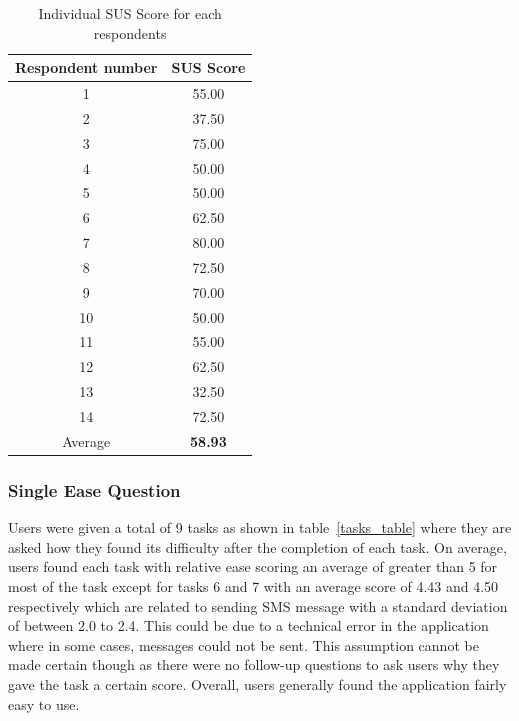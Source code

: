\documentclass{report}
\begin{document}
\begin{table}[h]
	\begin{tabular}{| c | c |}
		\hline
		\multicolumn{1}{|l|}{Respondent number} & SUS Score      \\ \hline
		1                                       & 55.00          \\ \hline
		2                                       & 37.50          \\ \hline
		3                                       & 75.00          \\ \hline
		4                                       & 50.00          \\ \hline
		5                                       & 50.00          \\ \hline
		6                                       & 62.50          \\ \hline
		7                                       & 80.00          \\ \hline
		8                                       & 72.50          \\ \hline
		9                                       & 70.00          \\ \hline
		10                                      & 50.00          \\ \hline
		11                                      & 55.00          \\ \hline
		12                                      & 62.50          \\ \hline
		13                                      & 32.50          \\ \hline
		14                                      & 72.50          \\ \hline
		Average                                 & \textbf{58.93} \\ \hline
	\end{tabular}
	\centering
	\caption{Individual SUS Score for each respondents}
	\label{sus_response}
	
\end{table}

\subsubsection{Single Ease Question}
Users were given a total of 9 tasks as shown in table~\ref{tasks_table} where they are asked how they found its difficulty after the completion of each task. On average, users found each task with relative ease scoring an average of greater than 5 for most of the task except for tasks 6 and 7 with an average score of 4.43 and 4.50 respectively which are related to sending SMS message with a standard deviation of between 2.0 to 2.4. This could be due to a technical error in the application where in some cases, messages could not be sent. This assumption cannot be made certain though as there were no follow-up questions to ask users why they gave the task a certain score. Overall, users generally found the application fairly easy to use.
\end{document}
